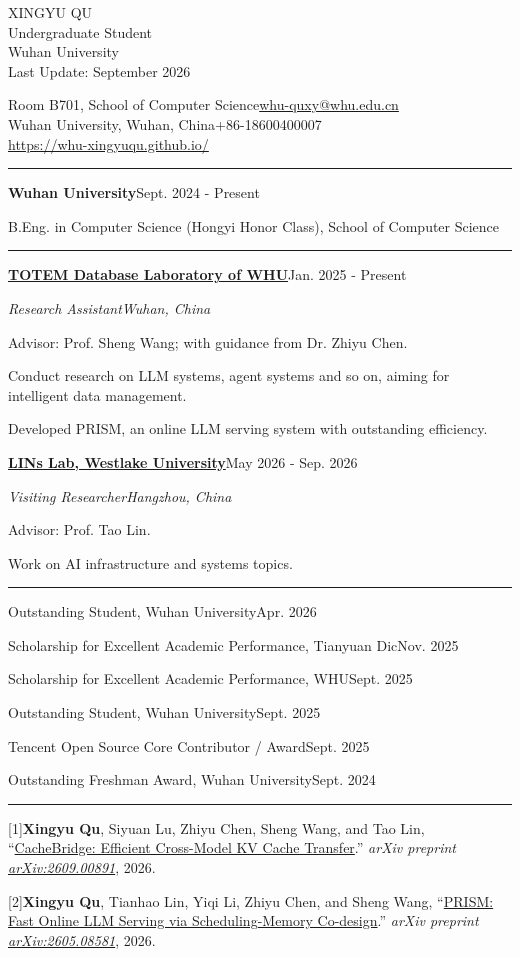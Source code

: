 \documentclass[a4paper,11pt]{article}
\newcommand{\cvsection}[1]{\par\vspace{8pt}{\large\bfseries #1}\par\vspace{1pt}\hrule\vspace{4pt}}
\newcommand{\entry}[2]{\textbf{#1}\hfill #2\par}
\newcommand{\cvbullet}[1]{\begingroup\leftskip=13pt\parindent=-13pt\textbullet\hspace{7pt}#1\par\endgroup}
\newcommand{\paper}[2]{\begingroup\leftskip=17pt\parindent=-17pt[#1]\hspace{4pt}#2\par\endgroup}
\begin{document}
\begin{center}
{\fontsize{16}{19}\selectfont XINGYU QU}\\[2pt]
Undergraduate Student\\
Wuhan University\\
Last Update: September 2026
\end{center}
\vspace{1pt}
Room B701, School of Computer Science\hfill\href{mailto:whu-quxy@whu.edu.cn}{whu-quxy@whu.edu.cn}\\
Wuhan University, Wuhan, China\hfill +86-18600400007\\
\mbox{}\hfill\href{https://whu-xingyuqu.github.io/}{https://whu-xingyuqu.github.io/}

\cvsection{Education}
\entry{Wuhan University}{Sept. 2024 - Present}
B.Eng. in Computer Science (Hongyi Honor Class), School of Computer Science

\cvsection{Research Experience}
\entry{\sffamily\href{http://totemdb.whu.edu.cn/}{TOTEM Database Laboratory of WHU}}{Jan. 2025 - Present}
\textit{Research Assistant}\hfill\textit{Wuhan, China}\par
Advisor: Prof. Sheng Wang; with guidance from Dr. Zhiyu Chen.\par
\cvbullet{Conduct research on LLM systems, agent systems and so on, aiming for intelligent data management.}
\cvbullet{Developed PRISM, an online LLM serving system with outstanding efficiency.}
\vspace{3pt}
\entry{\sffamily\href{https://lins-lab.github.io/}{LINs Lab, Westlake University}}{May 2026 - Sep. 2026}
\textit{Visiting Researcher}\hfill\textit{Hangzhou, China}\par
Advisor: Prof. Tao Lin.\par
\cvbullet{Work on AI infrastructure and systems topics.}

\cvsection{Awards and Honors}
Outstanding Student, Wuhan University\hfill Apr. 2026\par
Scholarship for Excellent Academic Performance, Tianyuan Dic\hfill Nov. 2025\par
Scholarship for Excellent Academic Performance, WHU\hfill Sept. 2025\par
Outstanding Student, Wuhan University\hfill Sept. 2025\par
Tencent Open Source Core Contributor / Award\hfill Sept. 2025\par
Outstanding Freshman Award, Wuhan University\hfill Sept. 2024

\cvsection{Papers}
\paper{1}{\textbf{Xingyu Qu}, Siyuan Lu, Zhiyu Chen, Sheng Wang, and Tao Lin,
``\href{https://arxiv.org/abs/2609.00891}{CacheBridge: Efficient Cross-Model KV Cache Transfer}.''
\textit{arXiv preprint \href{https://arxiv.org/abs/2609.00891}{arXiv:2609.00891}}, 2026.}
\vspace{4pt}
\paper{2}{\textbf{Xingyu Qu}, Tianhao Lin, Yiqi Li, Zhiyu Chen, and Sheng Wang,
``\href{https://arxiv.org/abs/2605.08581}{PRISM: Fast Online LLM Serving via Scheduling-Memory Co-design}.''
\textit{arXiv preprint \href{https://arxiv.org/abs/2605.08581}{arXiv:2605.08581}}, 2026.}
\end{document}
